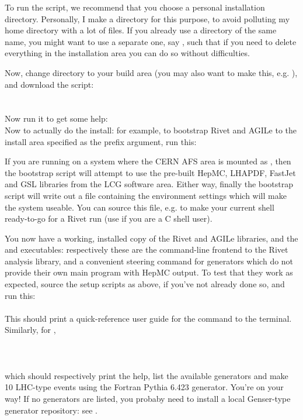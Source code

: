 \documentclass{JHEP3}
\begin{document}
To run the script, we recommend that you choose a personal installation
directory. Personally, I make a  directory for this purpose, to
avoid polluting my home directory with a lot of files. If you already use a
directory of the same name, you might want to use a separate one, say
, such that if you need to delete everything in the
installation area you can do so without difficulties.

Now, change directory to your build area (you may also want to make this,
e.g. ), and download the script:\\
\\
\\
Now run it to get some help:
\\
Now to actually do the install: for example, to bootstrap Rivet and AGILe
to the install area specified as the prefix argument, run this:\\

If you are running on a system where the CERN AFS area is mounted as
, then the bootstrap script will attempt to use the pre-built
HepMC\cite{Dobbs:2001ck}, LHAPDF\cite{Whalley:2005nh},
FastJet\cite{Cacciari:2005hq,fastjetweb} and GSL libraries from the LCG software area.
Either way, finally the bootstrap script will write out a file containing the
environment settings which will make the system useable. You can source this
file, e.g.  to make your current shell ready-to-go
for a Rivet run (use  if you are a C shell user).

You now have a working, installed copy of the Rivet and AGILe libraries, and the
 and  executables: respectively these are the
command-line frontend to the Rivet analysis library, and a convenient steering
command for generators which do not provide their own main program with HepMC
output. To test that they work as expected, source the setup scripts as above,
if you've not already done so, and run this:\\
\\
%
This should print a quick-reference user guide for the  command to
the terminal. Similarly, for ,\\
\\
\\
\\
which should respectively print the help, list the available generators and make
10 LHC-type events using the Fortran Pythia\cite{Sjostrand:2006za} 6.423 generator. You're on your
way! If no generators are listed, you probaby need to install a local
Genser-type generator repository: see .
\end{document}
